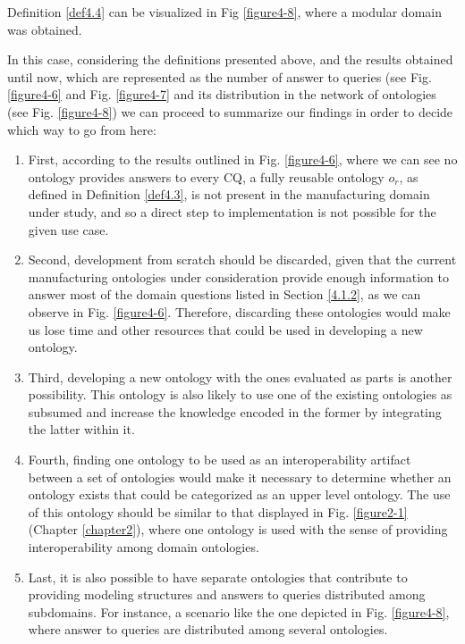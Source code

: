 Definition \ref{def4.4} can be visualized in Fig \ref{figure4-8}, where a modular domain was obtained. 

In this case, considering the definitions presented above, and the results obtained until now, which are represented as the number of answer to queries (see Fig. \ref{figure4-6} and Fig. \ref{figure4-7} and its distribution in the network of ontologies  (see Fig. \ref{figure4-8}) we can proceed to summarize our findings in order to decide which way to  go from here:

\begin{enumerate}
	
	\item 	\cbstart First, according to the results outlined in Fig. \ref{figure4-6}, where we can see no ontology provides answers to every CQ, a fully reusable ontology $o_{r}$, as defined in Definition \ref{def4.3}, is not present in the manufacturing domain under study, and so a direct step to implementation is not possible for the given use case. \cbend  \label{it1} 
	
	\item Second, development from scratch should be discarded, given that the current manufacturing ontologies under consideration provide enough information to answer most of the domain questions  listed in Section \ref{4.1.2}, as we can observe in Fig. \ref{figure4-6}. Therefore, discarding these ontologies would make us lose time and other resources that could be used in developing a new ontology. \label{it2}
	
	\item Third, developing a new ontology with the ones evaluated as parts is another possibility. This ontology is also likely to use one of the existing ontologies as subsumed   and increase the knowledge encoded in the former by integrating the latter within it. \label{it3}
	
	\item Fourth, finding one ontology to be used as an interoperability artifact between a set of ontologies would make it necessary to determine whether an ontology exists that could be categorized as an upper level ontology. The use of this ontology should be similar to that displayed in Fig. \ref{figure2-1} (Chapter \ref{chapter2}), where one ontology is used with the sense of providing interoperability among domain ontologies. \label{it4}
	
	\item  Last, it is also possible to have separate ontologies that contribute to providing modeling structures and answers to queries distributed among subdomains.   For instance, a scenario like the one depicted in Fig. \ref{figure4-8}, where answer to queries are distributed among several ontologies.  \label{it5}
	
\end{enumerate}

